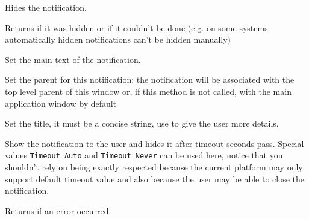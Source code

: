 Hides the notification.

Returns \true if it was hidden or \false if it couldn't be done (e.g. on some
systems automatically hidden notifications can't be hidden manually)


\label{wxnotificationmessagesetmessage}


Set the main text of the notification.


\label{wxnotificationmessagesetparent}


Set the parent for this notification: the notification will be associated with
the top level parent of this window or, if this method is not called, with the
main application window by default


\label{wxnotificationmessagesettitle}


Set the title, it must be a concise string, use 
 to give the user more
details.


\label{wxnotificationmessageshow}


Show the notification to the user and hides it after timeout seconds
pass. Special values \texttt{Timeout\_Auto} and \texttt{Timeout\_Never} can be
used here, notice that you shouldn't rely on  being exactly
respected because the current platform may only support default timeout value
and also because the user may be able to close the notification.

Returns \false if an error occurred.

